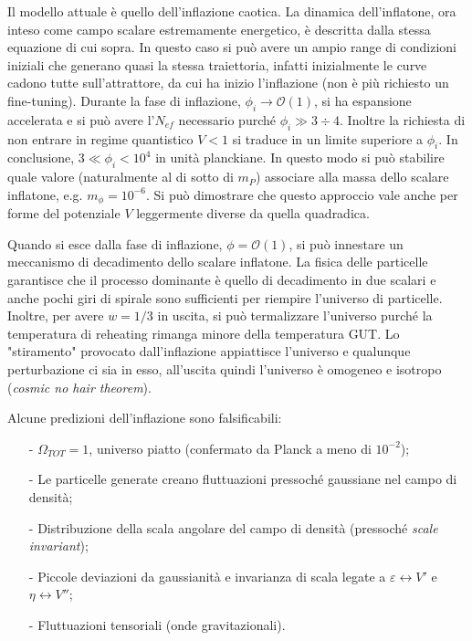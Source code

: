 Il modello attuale è quello dell'inflazione caotica. La dinamica dell'inflatone, ora inteso come campo scalare estremamente energetico, è descritta dalla stessa equazione di cui sopra. In questo caso si può avere un ampio range di condizioni iniziali che generano quasi la stessa traiettoria, infatti inizialmente le curve cadono tutte sull'attrattore, da cui ha inizio l'inflazione (non è più richiesto un fine-tuning). Durante la fase di inflazione, $\phi_i \rightarrow \mathcal{O}(1)$, si ha espansione accelerata e si può avere l'$N_{ef}$ necessario purché $\phi_i \gg 3\div 4$. Inoltre la richiesta di non entrare in regime quantistico $V<1$ si traduce in un limite superiore a $\phi_i$. In conclusione, $ 3 \ll \phi_i < 10^4$ in unità planckiane. In questo modo si può stabilire quale valore (naturalmente al di sotto di $m_P$) associare alla massa dello scalare inflatone, e.g. $m_\phi = 10^{-6}$. Si può dimostrare che questo approccio vale anche per forme del potenziale $V$ leggermente diverse da quella quadradica. 

Quando si esce dalla fase di inflazione, $\phi = \mathcal{O}(1)$, si può innestare un meccanismo di decadimento dello scalare inflatone. La fisica delle particelle garantisce che il processo dominante è quello di decadimento in due scalari e anche pochi giri di spirale sono sufficienti per riempire l'universo di particelle. Inoltre, per avere $w=1/3$ in uscita, si può termalizzare l'universo purché la temperatura di reheating rimanga minore della temperatura GUT. Lo "stiramento" provocato dall'inflazione appiattisce l'universo e qualunque perturbazione ci sia in esso, all'uscita quindi l'universo è omogeneo e isotropo (\textit{cosmic no hair theorem}).

\vspace{1em}
\noindent Alcune predizioni dell'inflazione sono falsificabili: 
\begin{itemize}
    \item[-] $\Omega_{TOT} = 1$, universo piatto (confermato da Planck a meno di $10^{-2}$);
    \item[-] Le particelle generate creano fluttuazioni pressoché gaussiane nel campo di densità;
    \item[-] Distribuzione della scala angolare del campo di densità (pressoché \textit{scale invariant});
    \item[-] Piccole deviazioni da gaussianità e invarianza di scala legate a $\varepsilon \leftrightarrow  V' $ e $\eta \leftrightarrow V''$;
    \item[-] Fluttuazioni tensoriali (onde gravitazionali).
\end{itemize}

